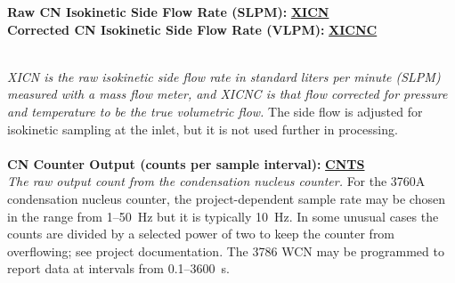 \begin{hangparagraphs}
\noindent\begin{minipage}[t]{1\columnwidth}%
\textbf{Raw CN Isokinetic Side Flow Rate (SLPM):}\textbf{
}\textbf{\uline{XICN}}\\
\textbf{Corrected CN Isokinetic Side Flow Rate (VLPM):}\textbf{
}\textbf{\uline{XICNC}}\textbf{\uline{}}%
\end{minipage}\\
\emph{XICN is the raw isokinetic side flow rate in standard liters
per minute (SLPM) measured with a mass flow meter, and XICNC is that
flow corrected for pressure and temperature to be the true volumetric
flow.} The side flow is adjusted for
isokinetic sampling at the inlet, but it is not used further in processing.
\\
\\

\textbf{CN Counter Output (counts per sample interval):}\textbf{
}\textbf{\uline{CNTS}}\\
\emph{The raw output count from the condensation nucleus counter.}
For the 3760A condensation nucleus counter, the project-dependent
sample rate may be chosen in the range from 1--50~Hz but it is typically
10~Hz. In some unusual cases the counts are divided by a selected
power of two to keep the counter from overflowing; see project documentation.
The 3786 WCN may be programmed to report data at intervals from 0.1--3600~s.\label{punch:7-1}


\end{hangparagraphs}
